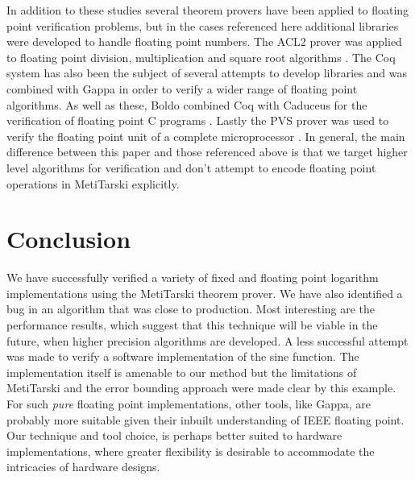\documentclass{fac}
\begin{document}
In addition to these studies several theorem provers have been applied to floating point verification problems, but in the cases referenced here additional libraries were developed to handle floating point numbers. The ACL2 prover was applied to floating point division, multiplication and square root algorithms \cite{russinoff1998mechanically,moore1996mechanically}. The Coq system has also been the subject of several attempts to develop libraries \cite{daumas2001generic,melquiond2012floating,boldo2011flocq} and was combined with Gappa \cite{boldo2009combining,daumas2010certification} in order to verify a wider range of floating point algorithms. As well as these, Boldo combined Coq with Caduceus for the verification of floating point C programs \cite{boldo2007formal}. Lastly the PVS prover was used to verify the floating point unit of a complete microprocessor \cite{jacobi2005formal}. In general, the main difference between this paper and those referenced above is that we target higher level algorithms for verification and don't attempt to encode floating point operations in MetiTarski explicitly. 

\section{Conclusion}
\label{Conclusion}
We have successfully verified a variety of fixed and floating point logarithm implementations using the MetiTarski theorem prover.
We have also identified a bug in an algorithm that was close to production. Most interesting are the performance results, which suggest that this technique will be viable in the future, when higher precision algorithms are developed. A less successful attempt was made to verify a software implementation of the sine function. The implementation itself is amenable to our method but the limitations of MetiTarski and the error bounding approach were made clear by this example. For such \textit{pure} floating point implementations, other tools, like Gappa, are probably more suitable given their inbuilt understanding of IEEE floating point. Our technique and tool choice, is perhaps better suited to hardware implementations, where greater flexibility is desirable to accommodate the intricacies of hardware designs.
\end{document}
